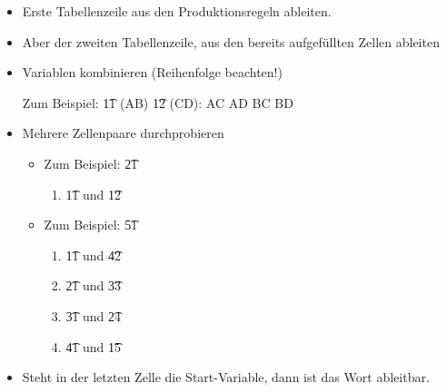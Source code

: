 \documentclass{lehramt-informatik-haupt}
\begin{document}
\begin{itemize}

\item Erste Tabellenzeile aus den Produktionsregeln ableiten.

\item Aber der zweiten Tabellenzeile, aus den bereits aufgefüllten Zellen ableiten

\item Variablen kombinieren (Reihenfolge beachten!)

Zum Beispiel: \t11 (AB) \t12 (CD): AC AD BC BD

\item Mehrere Zellenpaare durchprobieren

\begin{itemize}
\item Zum Beispiel: \t21

\begin{enumerate}
\item \t11 und \t12
\end{enumerate}

\item Zum Beispiel: \t51

\begin{enumerate}
\item \t11 und \t42
\item \t21 und \t33
\item \t31 und \t24
\item \t41 und \t15
\end{enumerate}
\end{itemize}

\item Steht in der letzten Zelle die Start-Variable, dann ist das Wort
ableitbar.

\end{itemize}


\literatur
\end{document}
